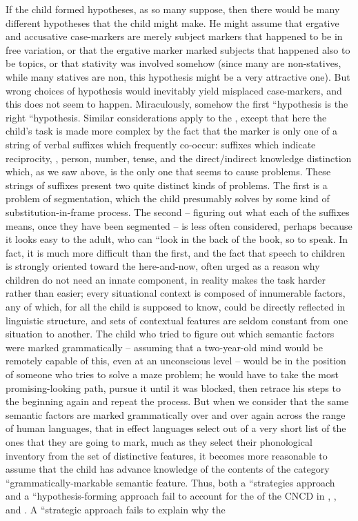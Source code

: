 If the child formed hypotheses, as so many suppose, then there would be many different hypotheses that the  child might make. He might assume that ergative and accusative case-markers are merely subject markers that happened to be in free variation, or that the ergative marker marked subjects that happened also to be topics, or that stativity was involved somehow (since many  are non-statives, while many statives are non, this hypothesis might be a very attractive one). But wrong choices of hypothesis would inevitably yield misplaced case-markers, and this does not seem to happen. Miraculously, somehow the first ``hypothesis is the right ``hypothesis. Similar considerations apply to the  , except
that here the child's task is made more complex by the fact that the  marker is only one of a string of verbal suffixes which frequently co-occur: suffixes which indicate reciprocity, , person, number, tense, and the direct/indirect knowledge distinction which, as we saw above, is the only one that seems to cause problems. These strings of suffixes present two quite distinct kinds of problems. The first is a problem of segmentation, which the child presumably solves by some kind of substitution-in-frame process. The second -- figuring out what each of the suffixes means, once they have been segmented -- is less often considered, perhaps because it looks easy to the adult, who can ``look in the back of the book, so to speak. In fact, it is much more difficult than the first, and the fact that speech to children is strongly oriented toward the here-and-now, often urged as a reason why children do not need an innate component, in reality makes the task harder rather than easier; every situational context is composed of innumerable factors, any of which, for all the child is supposed to know, could be directly reflected in linguistic structure, and sets of contextual features are seldom constant from one situation to another. The child who tried to figure out which semantic factors were marked grammatically -- assuming that a two-year-old mind would be remotely capable of this, even at an unconscious level -- would be in the position of someone who tries to solve a maze problem; he would have to take the most promising-looking path, pursue it until it was blocked, then retrace his steps to the beginning again and repeat the process. But when we consider that the same semantic factors are marked grammatically over and over again across the range of human languages, that in effect languages select out of a very short list of  the ones that they are going to mark, much as they select their phonological inventory from the set of distinctive features, it becomes more reasonable to assume that the child has advance knowledge of the contents of the category ``grammatically-markable semantic feature. Thus, both a ``strategies approach and a ``hypothesis-forming approach fail to account for the  of the CNCD in , , and . A ``strategic approach fails to explain why the
